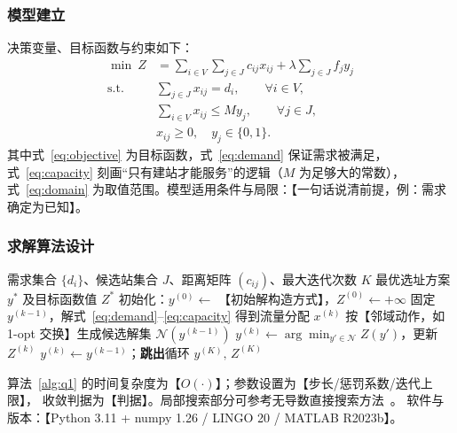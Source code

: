 \documentclass[12pt,a4paper,fontset=windows]{ctexart}
\begin{document}
\subsubsection{模型建立}
决策变量、目标函数与约束如下：
\begin{align}
  \min\ Z & = \sum_{i \in V}\sum_{j \in J} c_{ij} x_{ij}
             + \lambda \sum_{j \in J} f_j y_j
             \label{eq:objective} \\[2pt]
  \text{s.t.}\quad
  & \sum_{j \in J} x_{ij} = d_i, \qquad \forall i \in V, \label{eq:demand} \\[2pt]
  & \sum_{i \in V} x_{ij} \le M y_j, \qquad \forall j \in J, \label{eq:capacity} \\[2pt]
  & x_{ij} \ge 0,\quad y_j \in \{0,1\}. \label{eq:domain}
\end{align}
其中式~\eqref{eq:objective} 为目标函数，式~\eqref{eq:demand} 保证需求被满足，
式~\eqref{eq:capacity} 刻画“只有建站才能服务”的逻辑（$M$ 为足够大的常数），
式~\eqref{eq:domain} 为取值范围。模型适用条件与局限：【一句话说清前提，例：需求确定为已知】。

\subsubsection{求解算法设计}
\begin{algorithm}[H]
  \caption{【算法名，如：拉格朗日松弛 + 局部搜索】求解问题一}
  \label{alg:q1}
  \begin{algorithmic}[1]
    \Require 需求集合 $\{d_i\}$、候选站集合 $J$、距离矩阵 $(c_{ij})$、最大迭代次数 $K$
    \Ensure 最优选址方案 $y^{*}$ 及目标函数值 $Z^{*}$
    \State 初始化：$y^{(0)} \gets$ 【初始解构造方式】，$Z^{(0)} \gets +\infty$
      \State 固定 $y^{(k-1)}$，解式~\eqref{eq:demand}--\eqref{eq:capacity} 得到流量分配 $x^{(k)}$
      \State 按【邻域动作，如 1-opt 交换】生成候选解集 $\mathcal{N}(y^{(k-1)})$
        \State $y^{(k)} \gets \arg\min_{y' \in \mathcal{N}} Z(y')$，更新 $Z^{(k)}$
      \Else
        \State $y^{(k)} \gets y^{(k-1)}$；\textbf{跳出}循环
      \EndIf
    \EndFor
    \State \Return $y^{(K)},\, Z^{(K)}$
  \end{algorithmic}
\end{algorithm}

算法~\ref{alg:q1} 的时间复杂度为【$O(\cdot)$】；参数设置为【步长/惩罚系数/迭代上限】，
收敛判据为【判据】。局部搜索部分可参考无导数直接搜索方法~\cite{nelder1965simplex}。
软件与版本：【Python 3.11 + numpy 1.26 / LINGO 20 / MATLAB R2023b】。
\end{document}
